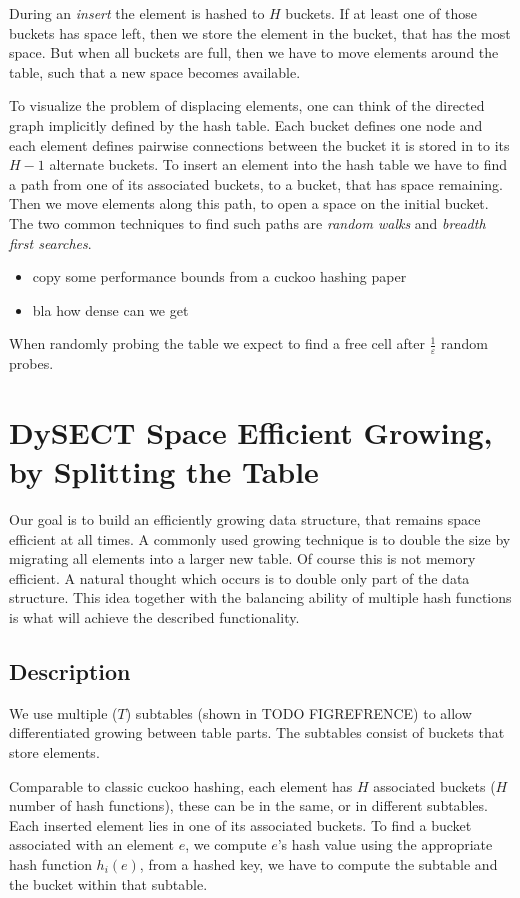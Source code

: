 \documentclass[a4paper,UKenglish]{lipics-v2016}
\begin{document}
During an \emph{insert} the element is hashed to $H$ buckets.  If at least
one of those buckets has space left, then we store the element in the
bucket, that has the most space.  But when all buckets are full, then we
have to move elements around the table, such that a new space becomes
available.

\label{sec:cuckoo_graph}
To visualize the problem of displacing elements, one can think of the
directed graph implicitly defined by the hash table.  Each bucket
defines one node and each element defines pairwise connections between
the bucket it is stored in to its $H-1$ alternate buckets.  To insert
an element into the hash table we have to find a path from one of its
associated buckets, to a bucket, that has space remaining.  Then we
move elements along this path, to open a space on the initial bucket.
The two common techniques to find such paths are \emph{random walks} and
\emph{breadth first searches}.

\begin{itemize}
\item copy some performance bounds from a cuckoo hashing paper
\item bla how dense can we get
\end{itemize}

When randomly probing the table we expect to find a free cell after
$\frac{1}{\varepsilon}$ random probes.

\section{DySECT Space Efficient Growing, by Splitting the Table}
Our goal is to build an efficiently growing data structure, that
remains space efficient at all times.  A commonly used growing
technique is to double the size by migrating all elements
into a larger new table.  Of course this is
not memory efficient.  A natural thought which occurs is to double
only part of the data structure.  This idea together with the
balancing ability of multiple hash functions is what will achieve the
described functionality.

\subsection{Description}
We use multiple ($T$) subtables (shown in TODO FIGREFRENCE) to allow
differentiated growing between table parts.  The subtables consist of
buckets that store elements.

Comparable to classic cuckoo hashing, each element has $H$ associated
buckets ($H$ number of hash functions), these can be in the same, or
in different subtables.  Each inserted element lies in one of its
associated buckets.  To find a bucket associated with an element $e$,
we compute $e$'s hash value using the appropriate hash function
$h_i(e)$, from a hashed key, we have to compute the subtable and the bucket
within that subtable.
\end{document}
